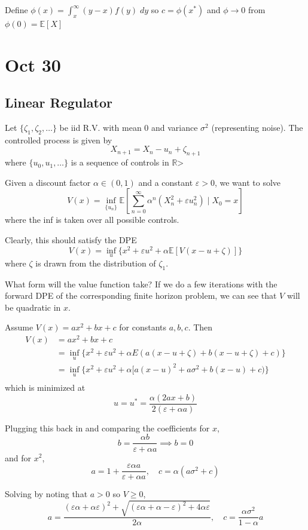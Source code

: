 \documentclass[12pt]{report}
\newcommand{\R}{\mathbb{R}}
\newcommand{\E}{\mathbb{E}}
\newcommand{\ep}{\varepsilon}
\begin{document}
    Define $\phi(x) = \int_x^{\infty} (y - x) f(y)\; dy$ so $c = \phi(x^*)$ and $\phi \to 0$ from $\phi(0) = \E[X]$

\section{Oct 30}
\subsection*{Linear Regulator}
    Let $\{\zeta_1, \zeta_2, \dots\}$ be iid R.V. with mean $0$ and variance $\sigma^2$ (representing noise). The controlled process is given by 
    \[X_{n+1} = X_n - u_n + \zeta_{n+1}\]
    where $\{u_0, u_1, \dots\}$ is a sequence of controls in $\R$> 

    Given a discount factor $\alpha \in (0, 1)$ and a constant $\ep > 0$, we want to solve 
    \[V(x) = \inf_{\{u_n\}} \E\left[\sum_{n=0}^\infty \alpha^n (X_n^2 + \ep u_n^2)\; \bigg\vert \; X_0 = x\right]\]
    where the inf is taken over all possible controls. 

    Clearly, this should satisfy the DPE
    \[V(x) = \inf_u \{x^2 + \ep u^2 + \alpha \E[V(x - u + \zeta)]\}\]
    where $\zeta$ is drawn from the distribution of $\zeta_1$. 

    What form will the value function take? If we do a few iterations with the forward DPE of the corresponding finite horizon problem, we can see that $V$ will be quadratic in $x$. 

    Assume $V(x) = ax^2 + bx + c$ for constants $a, b, c$. Then
    \begin{align*}
        V(x) &= ax^2 + bx + c \\ 
        &= \inf_u \{x^2 + \ep u^2 + \alpha E(a(x - u + \zeta) + b(x - u + \zeta) + c)\}\\ 
        &= \inf_u \{x^2 + \ep u^2 + \alpha[a(x - u)^2 + a\sigma^2 + b(x - u) + c)\}\\
    \end{align*}
    which is minimized at 
    \[u = u^* = \frac{\alpha (2 ax + b)}{2(\ep + \alpha a)}\]
    
    Plugging this back in and comparing the coefficients for $x$, 
    \[b = \frac{\alpha b}{\ep + \alpha a} \implies b = 0\]
    and for $x^2$,
    \[a = 1 + \frac{\ep \alpha a}{\ep + \alpha a}, \quad c = \alpha(a \sigma^2 + c)\]

    Solving by noting that $a > 0$ so $V \geq 0$, 
    \[a = \frac{(\ep \alpha + \alpha  \ep)^2 + \sqrt{(\ep \alpha + \alpha - \ep)^2 +4\alpha \ep}}{2\alpha}, \quad c = \frac{\alpha\sigma^2}{1 - \alpha}a\]
\end{document}

